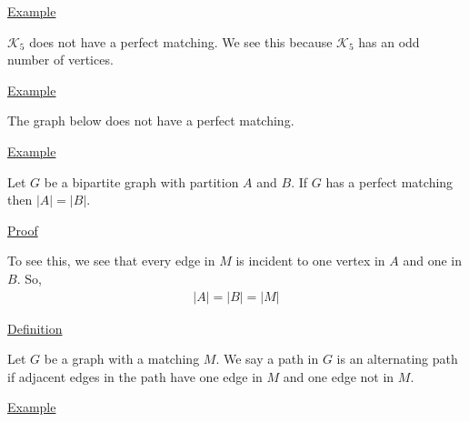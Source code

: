 \documentclass{article}
\begin{document}
\underline{Example}

$\mathcal{K}_5$ does not have a perfect matching. We see this because $\mathcal{K}_5$ has an odd number of vertices. 

\underline{Example}

The graph below does not have a perfect matching. 

\begin{center}
\end{center}

\underline{Example}

Let $G$ be a bipartite graph with partition $A$ and $B$. If $G$ has a perfect matching then $|A| = |B|$. 

\underline{Proof}

To see this, we see that every edge in $M$ is incident to one vertex in $A$ and one in $B$. So,
\begin{align*}
    |A| = |B| = |M|
\end{align*}

\underline{Definition}

Let $G$ be a graph with a matching $M$. We say a path in $G$ is an alternating path if adjacent edges in the path have one edge in $M$ and one edge not in $M$. 

\underline{Example}

\begin{center}
\end{center}
\end{document}
